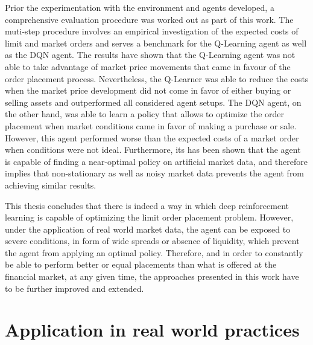 Prior the experimentation with the environment and agents developed, a comprehensive evaluation procedure was worked out as part of this work.
The muti-step procedure involves an empirical investigation of the expected costs of limit and market orders and serves a benchmark for the Q-Learning agent as well as the DQN agent.
The results have shown that the Q-Learning agent was not able to take advantage of market price movements that came in favour of the order placement process.
Nevertheless, the Q-Learner was able to reduce the costs when the market price development did not come in favor of either buying or selling assets and outperformed all considered agent setups.
The DQN agent, on the other hand, was able to learn a policy that allows to optimize the order placement when market conditions came in favor of making a purchase or sale.
However, this agent performed worse than the expected costs of a market order when conditions were not ideal.
Furthermore, its has been shown that the agent is capable of finding a near-optimal policy on artificial market data, and therefore implies that non-stationary as well as noisy market data prevents the agent from achieving similar results.

This thesis concludes that there is indeed a way in which deep reinforcement learning is capable of optimizing the limit order placement problem.
However, under the application of real world market data, the agent can be exposed to severe conditions, in form of wide spreads or absence of liquidity, which prevent the agent from applying an optimal policy.
Therefore, and in order to constantly be able to perform better or equal placements than what is offered at the financial market, at any given time, the approaches presented in this work have to be further improved and extended.

\section{Application in real world practices}